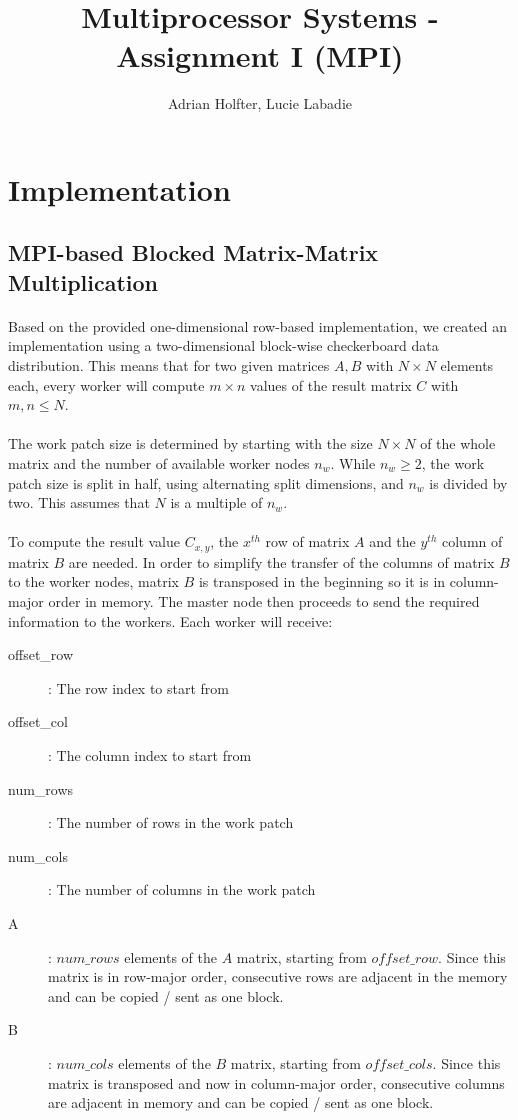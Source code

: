 \documentclass[]{article}
\title{Multiprocessor Systems - Assignment I (MPI)}
\author{Adrian Holfter, Lucie Labadie}
\begin{document}
\maketitle

\section{Implementation}

\subsection{MPI-based Blocked Matrix-Matrix Multiplication}

\paragraph{} Based on the provided one-dimensional row-based implementation, we created an implementation using a two-dimensional block-wise checkerboard data distribution. This means that for two given matrices $A,B$ with $N \times N$ elements each, every worker will compute $m \times n$ values of the result matrix $C$ with $m,n \leq N$.

\paragraph{} The work patch size is determined by starting with the size $N \times N$ of the whole matrix and the number of available worker nodes $n_w$. While $n_w \geq 2$, the work patch size is split in half, using alternating split dimensions, and $n_w$ is divided by two. This assumes that $N$ is a multiple of $n_w$.

\paragraph{}
To compute the result value $C_{x,y}$, the $x^{th}$ row of matrix $A$ and the $y^{th}$ column of matrix $B$ are needed.
In order to simplify the transfer of the columns of matrix $B$ to the worker nodes, matrix $B$ is transposed in the beginning so it is in column-major order in memory.
The master node then proceeds to send the required information to the workers. Each worker will receive:
\begin{description}
	\item[offset\_row]: The row index to start from
	\item[offset\_col]: The column index to start from
	\item[num\_rows]: The number of rows in the work patch
	\item[num\_cols]: The number of columns in the work patch
	\item[A]: $num\_rows$ elements of the $A$ matrix, starting from $offset\_row$. Since this matrix is in row-major order, consecutive rows are adjacent in the memory and can be copied / sent as one block.
	\item[B]: $num\_cols$ elements of the $B$ matrix, starting from $offset\_cols$. Since this matrix is transposed and now in column-major order, consecutive columns are adjacent in memory and can be copied / sent as one block.
\end{description}
\end{document}
